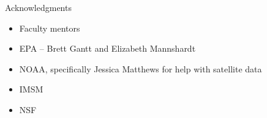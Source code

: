 \documentclass[notheorems,envcountsect,allowframebreaks,xcolor=svgnames,8pt]{beamer}
\begin{document}


\begin{frame}{Acknowledgments}
\begin{itemize}
\item Faculty mentors
\item EPA -- Brett Gantt and Elizabeth Mannshardt
\item  NOAA, specifically Jessica Matthews for help with  satellite data
\item IMSM
\item NSF
\end{itemize}
\end{frame}
\end{document}
